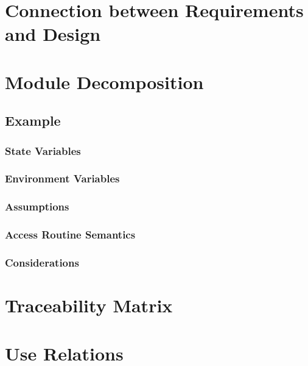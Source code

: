 \documentclass{article}
\begin{document}
\section{Connection between Requirements and Design}

\section{Module Decomposition}
\subsection{Example}
\subsubsection{State Variables}
\subsubsection{Environment Variables}
\subsubsection{Assumptions}
\subsubsection{Access Routine Semantics}
\subsubsection{Considerations}

\section{Traceability Matrix}

\section{Use Relations}
\end{document}
